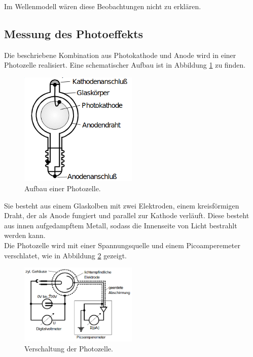     \noindent Im Wellenmodell wären diese Beobachtungen nicht zu erklären.

\subsection{Messung des Photoeffekts}
    Die beschriebene Kombination aus Photokathode und Anode wird in einer Photozelle realisiert. Eine schematischer Aufbau ist in Abbildung \ref{fig:photozelle} 
    zu finden.

    \begin{figure}
        \centering
        \includegraphics[width=0.5\textwidth]{zelle.png}
        \caption{Aufbau einer Photozelle.}
        \label{fig:photozelle}
    \end{figure}

    \noindent Sie besteht aus einem Glaskolben mit zwei Elektroden, einem kreisförmigen Draht, der als Anode fungiert und parallel zur Kathode verläuft. Diese 
    besteht aus innen aufgedampftem Metall, sodass die Innenseite von Licht bestrahlt werden kann.\\
    Die Photozelle wird mit einer Spannungsquelle und einem Picoamperemeter verschlatet, wie in Abbildung \ref{fig:schalt}
    gezeigt.

    \begin{figure}
        \centering
        \includegraphics[width=0.5\textwidth]{schalt.png}
        \caption{Verschaltung der Photozelle.}
        \label{fig:schalt}
    \end{figure}

